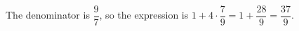 The denominator is $\dfrac{9}{7}$, so the expression is $ 1+4\cdot\dfrac{7}{9}=1+\dfrac{28}{9}=\boxed{\dfrac{37}{9}}$.
